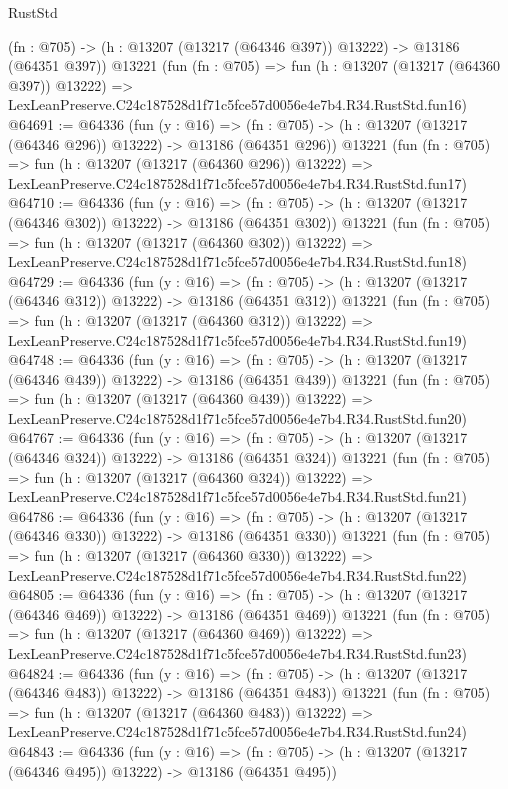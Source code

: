 \begin{lexlean}{RustStd}
\begin{coremodule}
    (fn : @705) -> (h : @13207 (@13217 (@64346 @397)) @13222) -> @13186 (@64351 @397))
    @13221
    (fun (fn : @705) =>
    fun (h : @13207 (@13217 (@64360 @397)) @13222) =>
    LexLeanPreserve.C24c187528d1f71c5fce57d0056e4e7b4.R34.RustStd.fun16)
@64691 := @64336
    (fun (y : @16) =>
    (fn : @705) -> (h : @13207 (@13217 (@64346 @296)) @13222) -> @13186 (@64351 @296))
    @13221
    (fun (fn : @705) =>
    fun (h : @13207 (@13217 (@64360 @296)) @13222) =>
    LexLeanPreserve.C24c187528d1f71c5fce57d0056e4e7b4.R34.RustStd.fun17)
@64710 := @64336
    (fun (y : @16) =>
    (fn : @705) -> (h : @13207 (@13217 (@64346 @302)) @13222) -> @13186 (@64351 @302))
    @13221
    (fun (fn : @705) =>
    fun (h : @13207 (@13217 (@64360 @302)) @13222) =>
    LexLeanPreserve.C24c187528d1f71c5fce57d0056e4e7b4.R34.RustStd.fun18)
@64729 := @64336
    (fun (y : @16) =>
    (fn : @705) -> (h : @13207 (@13217 (@64346 @312)) @13222) -> @13186 (@64351 @312))
    @13221
    (fun (fn : @705) =>
    fun (h : @13207 (@13217 (@64360 @312)) @13222) =>
    LexLeanPreserve.C24c187528d1f71c5fce57d0056e4e7b4.R34.RustStd.fun19)
@64748 := @64336
    (fun (y : @16) =>
    (fn : @705) -> (h : @13207 (@13217 (@64346 @439)) @13222) -> @13186 (@64351 @439))
    @13221
    (fun (fn : @705) =>
    fun (h : @13207 (@13217 (@64360 @439)) @13222) =>
    LexLeanPreserve.C24c187528d1f71c5fce57d0056e4e7b4.R34.RustStd.fun20)
@64767 := @64336
    (fun (y : @16) =>
    (fn : @705) -> (h : @13207 (@13217 (@64346 @324)) @13222) -> @13186 (@64351 @324))
    @13221
    (fun (fn : @705) =>
    fun (h : @13207 (@13217 (@64360 @324)) @13222) =>
    LexLeanPreserve.C24c187528d1f71c5fce57d0056e4e7b4.R34.RustStd.fun21)
@64786 := @64336
    (fun (y : @16) =>
    (fn : @705) -> (h : @13207 (@13217 (@64346 @330)) @13222) -> @13186 (@64351 @330))
    @13221
    (fun (fn : @705) =>
    fun (h : @13207 (@13217 (@64360 @330)) @13222) =>
    LexLeanPreserve.C24c187528d1f71c5fce57d0056e4e7b4.R34.RustStd.fun22)
@64805 := @64336
    (fun (y : @16) =>
    (fn : @705) -> (h : @13207 (@13217 (@64346 @469)) @13222) -> @13186 (@64351 @469))
    @13221
    (fun (fn : @705) =>
    fun (h : @13207 (@13217 (@64360 @469)) @13222) =>
    LexLeanPreserve.C24c187528d1f71c5fce57d0056e4e7b4.R34.RustStd.fun23)
@64824 := @64336
    (fun (y : @16) =>
    (fn : @705) -> (h : @13207 (@13217 (@64346 @483)) @13222) -> @13186 (@64351 @483))
    @13221
    (fun (fn : @705) =>
    fun (h : @13207 (@13217 (@64360 @483)) @13222) =>
    LexLeanPreserve.C24c187528d1f71c5fce57d0056e4e7b4.R34.RustStd.fun24)
@64843 := @64336
    (fun (y : @16) =>
    (fn : @705) -> (h : @13207 (@13217 (@64346 @495)) @13222) -> @13186 (@64351 @495))

\end{coremodule}
\end{lexlean}
